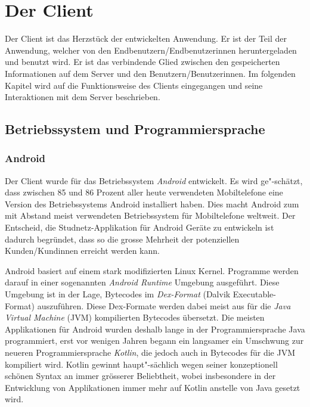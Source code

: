 \documentclass[../main.tex]{subfiles}
\begin{document}
	\chapter{Der Client}
	Der Client ist das Herzstück der entwickelten Anwendung. Er ist der Teil der Anwendung, welcher von den Endbenutzern/Endbenutzerinnen heruntergeladen und benutzt wird. Er ist das verbindende Glied zwischen den gespeicherten Informationen auf dem Server und den Benutzern/Benutzerinnen. Im folgenden Kapitel wird auf die Funktionsweise des Clients eingegangen und seine Interaktionen mit dem Server beschrieben.
	
	\section{Betriebssystem und Programmiersprache}
	
	\subsection{Android}
	Der Client wurde für das Betriebssystem \emph{Android} entwickelt. Es wird ge"-schätzt, dass zwischen 85 und 86 Prozent aller heute verwendeten Mobiltelefone eine Version des Betriebssystems Android installiert haben. Dies macht Android zum mit Abstand meist verwendeten Betriebssystem für Mobiltelefone weltweit. Der Entscheid, die Studnetz-Applikation für Android Geräte zu entwickeln ist dadurch begründet, dass so die grosse Mehrheit der potenziellen Kunden/Kundinnen erreicht werden kann. \cite{android} %
	
	Android basiert auf einem stark modifizierten Linux Kernel. Programme werden darauf in einer sogenannten \emph{Android Runtime} Umgebung ausgeführt. Diese Umgebung ist in der Lage, Bytecodes im \emph{Dex-Format} (Dalvik Executable-Format) auszuführen. Diese Dex-Formate werden dabei meist aus für die \emph{Java Virtual Machine} (JVM) kompilierten Bytecodes übersetzt. Die meisten Applikationen für Android wurden deshalb lange in der Programmiersprache Java programmiert, erst vor wenigen Jahren begann ein langsamer ein Umschwung zur neueren Programmiersprache \emph{Kotlin}, die jedoch auch in Bytecodes für die JVM kompiliert wird. Kotlin gewinnt haupt"-sächlich wegen seiner konzeptionell schönen Syntax an immer grösserer Beliebtheit, wobei insbesondere in der Entwicklung von Applikationen immer mehr auf Kotlin anstelle von Java gesetzt wird. \cite{androidJava}
	
\end{document}
